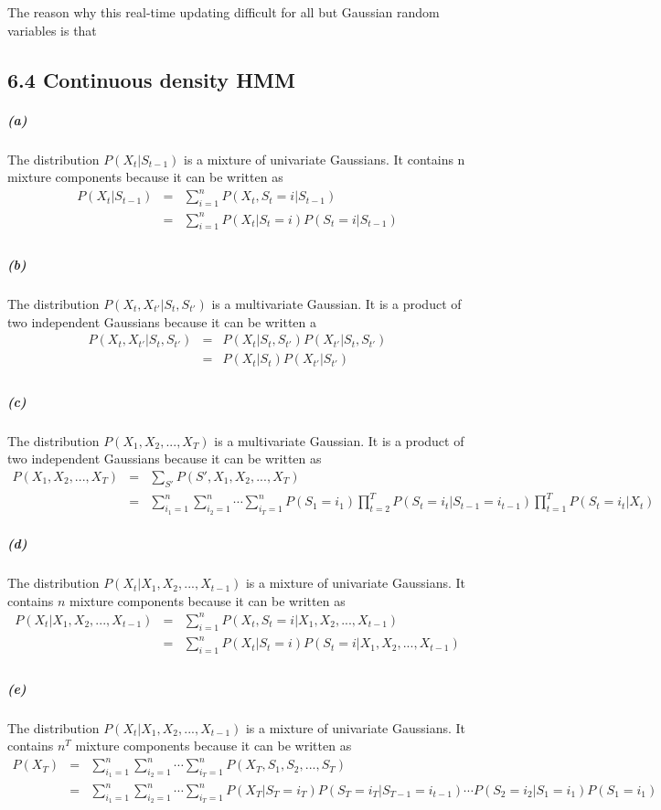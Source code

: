 \documentclass{article}
\begin{document}
The reason why this real-time updating difficult for all but Gaussian random variables is that 
\subsection*{6.4 Continuous density HMM}
\subparagraph*{(a)}
The distribution $P(X_t | S_{t-1})$ is a mixture of univariate Gaussians.
It contains n mixture components because it can be written as
\begin{eqnarray*}
	P(X_t | S_{t-1}) &=& \sum_{i=1}^{n} P(X_t, S_t = i| S_{t-1})\\
	&=& \sum_{i=1}^{n} P(X_t |S_t = i)P(S_t = i | S_{t-1})\\
\end{eqnarray*}

\subparagraph*{(b)}
The distribution $P(X_t , X_{t'}| S_t , S_{t'})$ is a multivariate Gaussian.
It is a product of two independent Gaussians because it can be written a
\begin{eqnarray*}
	P(X_t , X_{t'}| S_t , S_{t'}) &=& P(X_t| S_t , S_{t'})P( X_{t'}| S_t , S_{t'})\\ 
	&=& P(X_t| S_t)P( X_{t'}| S_{t'})\\
\end{eqnarray*}

\subparagraph*{(c)}
The distribution $P(X_1, X_2, ..., X_T)$ is a multivariate Gaussian.
It is a product of two independent Gaussians because it can be written as
\begin{eqnarray*}
	P(X_1, X_2, ..., X_T) &=& \sum_{S'} P(S', X_1, X_2, ..., X_T)\\
	&=& \sum_{i_1=1}^{n}\sum_{i_2=1}^{n}\cdots\sum_{i_T=1}^{n}P(S_1 = i_1)\prod_{t=2}^{T}P(S_t = i_t | S_{t-1} = i_{t-1})\prod_{t=1}^{T}P(S_t = i_t | X_t)
\end{eqnarray*}

\subparagraph*{(d)}
The distribution $P(X_t | X_1, X_2, ..., X_{t-1})$ is a mixture of univariate Gaussians.
It contains $n$ mixture components because it can be written as
\begin{eqnarray*}
	P(X_t | X_1, X_2, ..., X_{t-1}) &=& \sum_{i=1}^n  P(X_t , S_t = i| X_1, X_2, ..., X_{t-1})\\
	&=& \sum_{i=1}^n  P(X_t | S_t = i)P(S_t = i| X_1, X_2, ..., X_{t-1})\\
\end{eqnarray*}

\subparagraph*{(e)}
The distribution $P(X_t | X_1, X_2, ..., X_{t-1})$ is a mixture of univariate Gaussians.
It contains $n^T$ mixture components because it can be written as
\begin{eqnarray*}
	P(X_T) &=& \sum_{i_1=1}^{n}\sum_{i_2=1}^{n}\cdots\sum_{i_T=1}^{n} P(X_T, S_1, S_2, ..., S_T)\\
	&=& \sum_{i_1=1}^{n}\sum_{i_2=1}^{n}\cdots\sum_{i_T=1}^{n}P(X_T|S_T=i_T)P(S_T=i_T|S_{T-1}=i_{t-1})\cdots  P(S_2=i_2|S_1=i_1)P(S_1 = i_1)\\
\end{eqnarray*}
\end{document}
